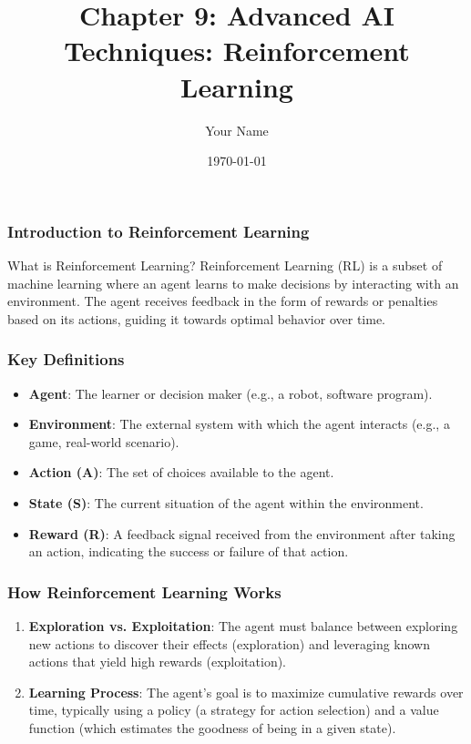 \documentclass{beamer}
\title{Chapter 9: Advanced AI Techniques: Reinforcement Learning}
\author{Your Name}
\institute{Your Institution}
\date{\today}
\begin{document}
\frame{\titlepage}

\begin{frame}[fragile]
    \frametitle{Introduction to Reinforcement Learning}
    \begin{block}{What is Reinforcement Learning?}
        Reinforcement Learning (RL) is a subset of machine learning where an agent learns to make decisions by interacting with an environment. The agent receives feedback in the form of rewards or penalties based on its actions, guiding it towards optimal behavior over time.
    \end{block}
\end{frame}

\begin{frame}[fragile]
    \frametitle{Key Definitions}
    \begin{itemize}
        \item \textbf{Agent}: The learner or decision maker (e.g., a robot, software program).
        \item \textbf{Environment}: The external system with which the agent interacts (e.g., a game, real-world scenario).
        \item \textbf{Action (A)}: The set of choices available to the agent.
        \item \textbf{State (S)}: The current situation of the agent within the environment.
        \item \textbf{Reward (R)}: A feedback signal received from the environment after taking an action, indicating the success or failure of that action.
    \end{itemize}
\end{frame}

\begin{frame}[fragile]
    \frametitle{How Reinforcement Learning Works}
    \begin{enumerate}
        \item \textbf{Exploration vs. Exploitation}: The agent must balance between exploring new actions to discover their effects (exploration) and leveraging known actions that yield high rewards (exploitation).
        \item \textbf{Learning Process}: The agent's goal is to maximize cumulative rewards over time, typically using a policy (a strategy for action selection) and a value function (which estimates the goodness of being in a given state).
    \end{enumerate}
\end{frame}
\end{document}
